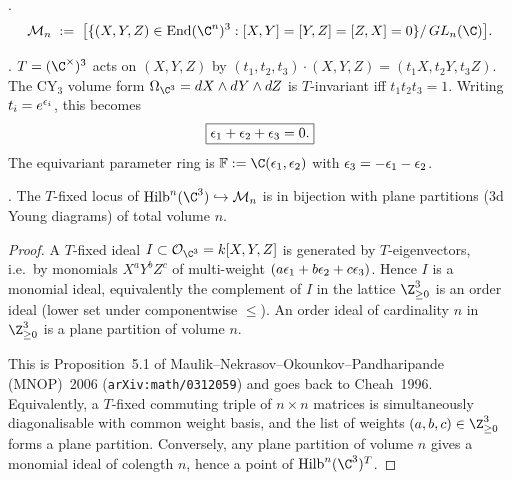 \begin{definition}
\label{opus:def:moduli-stack}
\ClaimStatusDefinition.
\[
 \mathcal{M}_n \;:=\; \bigl[\{(X,Y,Z) \in \mathrm{End}(\C^n)^3 : [X,Y] = [Y,Z] = [Z,X] = 0\}/\,GL_n(\C)\bigr].
\]
\end{definition}

\begin{definition}
\label{opus:def:torus-cy3}
\ClaimStatusDefinition.
$T = (\C^\times)^3$ acts on $(X, Y, Z)$ by $(t_1, t_2, t_3) \cdot (X, Y, Z)
= (t_1 X, t_2 Y, t_3 Z)$. The CY$_3$ volume form $\Omega_{\C^3} = dX \wedge dY \wedge dZ$
is $T$-invariant iff $t_1 t_2 t_3 = 1$. Writing $t_i = e^{\epsilon_i}$, this becomes
\[
\boxed{\epsilon_1 + \epsilon_2 + \epsilon_3 = 0.}
\]
The equivariant parameter ring is $\mathbb{F} := \C(\eps_1, \eps_2)$ with
$\epsilon_3 = -\epsilon_1 - \epsilon_2$.
\end{definition}

\begin{lemma}[$T$-fixed loci = plane partitions]
\label{opus:lem:T-fixed-plane-partitions}
\ClaimStatusDerivation.
The $T$-fixed locus of $\Hilb^n(\C^3) \hookrightarrow \mathcal{M}_n$ is in bijection
with plane partitions (3d Young diagrams) of total volume $n$.
\end{lemma}

\begin{proof}
A $T$-fixed ideal $I \subset \mathcal{O}_{\C^3} = k[X, Y, Z]$ is generated by
$T$-eigenvectors, i.e.\ by monomials $X^a Y^b Z^c$ of multi-weight
$(a\epsilon_1 + b\epsilon_2 + c\epsilon_3)$. Hence $I$ is a monomial ideal, equivalently
the complement of $I$ in the lattice $\Z_{\geq 0}^3$ is an order ideal
(lower set under componentwise $\leq$). An order ideal of cardinality $n$
in $\Z_{\geq 0}^3$ is a plane partition of volume $n$.

This is Proposition~5.1 of Maulik--Nekrasov--Okounkov--Pandharipande (MNOP)~2006
(\texttt{arXiv:math/0312059}) and goes back to Cheah~1996. Equivalently, a
$T$-fixed commuting triple of $n \times n$ matrices is simultaneously diagonalisable
with common weight basis, and the list of weights $(a, b, c) \in \Z_{\geq 0}^3$
forms a plane partition. Conversely, any plane partition of volume $n$ gives a
monomial ideal of colength $n$, hence a point of $\Hilb^n(\C^3)^T$.
\end{proof}

